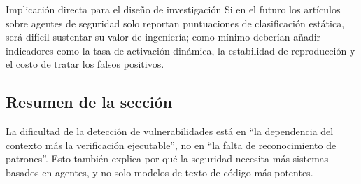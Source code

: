 \begin{importantbox}{Implicación directa para el diseño de investigación}
Si en el futuro los artículos sobre agentes de seguridad solo reportan puntuaciones de clasificación estática, será difícil sustentar su valor de ingeniería; como mínimo deberían añadir indicadores como la tasa de activación dinámica, la estabilidad de reproducción y el costo de tratar los falsos positivos.
\end{importantbox}

\subsection{Resumen de la sección}
La dificultad de la detección de vulnerabilidades está en ``la dependencia del contexto más la verificación ejecutable'', no en ``la falta de reconocimiento de patrones''. Esto también explica por qué la seguridad necesita más sistemas basados en agentes, y no solo modelos de texto de código más potentes.
